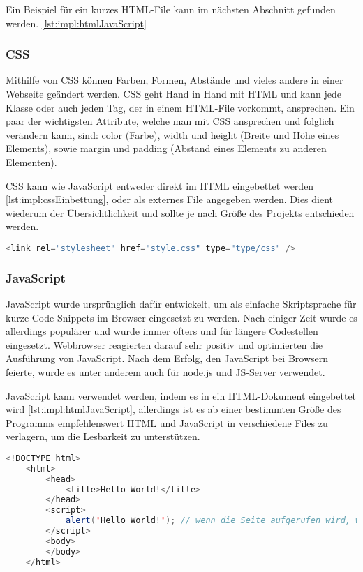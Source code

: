 Ein Beispiel für ein kurzes HTML-File kann im nächsten Abschnitt gefunden werden. \ref{lst:impl:htmlJavaScript}
 
\subsubsection{CSS}
Mithilfe von CSS können Farben, Formen, Abstände und vieles andere in einer Webseite geändert werden. CSS geht Hand in Hand mit HTML und kann jede Klasse oder auch jeden Tag, der in einem HTML-File vorkommt, ansprechen. Ein paar der wichtigsten Attribute, welche man mit CSS ansprechen und folglich verändern kann, sind: color (Farbe), width und height (Breite und Höhe eines Elements), sowie margin und padding (Abstand eines Elements zu anderen Elementen).
 
CSS kann wie JavaScript entweder direkt im HTML eingebettet werden \ref{lst:impl:cssEinbettung}, oder als externes File angegeben werden. Dies dient wiederum der Übersichtlichkeit und sollte je nach Größe des Projekts entschieden werden.
 
\begin{lstlisting}[language=java,caption=CSS Einbettung,label=lst:impl:cssEinbettung]
    <link rel="stylesheet" href="style.css" type="type/css" />
\end{lstlisting}
 
\subsubsection{JavaScript}
JavaScript wurde ursprünglich dafür entwickelt, um als einfache Skriptsprache für kurze Code-Snippets im Browser eingesetzt zu werden. Nach einiger Zeit wurde es allerdings populärer und wurde immer öfters und für längere Codestellen eingesetzt. Webbrowser reagierten darauf sehr positiv und optimierten die Ausführung von JavaScript. Nach dem Erfolg, den JavaScript bei Browsern feierte, wurde es unter anderem auch für node.js und JS-Server verwendet.
 
JavaScript kann verwendet werden, indem es in ein HTML-Dokument eingebettet wird \ref{lst:impl:htmlJavaScript}, allerdings ist es ab einer bestimmten Größe des Programms empfehlenswert HTML und JavaScript in verschiedene Files zu verlagern, um die Lesbarkeit zu unterstützen.
 
\begin{lstlisting}[language=java,caption=HTML mit eingebettetem JavaScript,label=lst:impl:htmlJavaScript]
    <!DOCTYPE html>
    <html>
        <head>
            <title>Hello World!</title>
        </head>
        <script>
            alert('Hello World!'); // wenn die Seite aufgerufen wird, wird mithilfe von JavaScript ein Alert-Fenster mit 'Hello World!' ausgegeben
        </script>
        <body>
        </body>
    </html>
\end{lstlisting}
 
